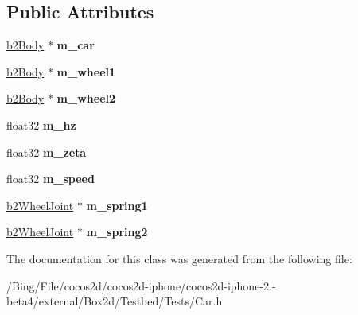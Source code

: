 \subsection*{Public Attributes}
\begin{DoxyCompactItemize}
\item 
\hypertarget{class_car_a5192d748b9653d608ed83ff331fed09f}{\hyperlink{classb2_body}{b2\-Body} $\ast$ {\bfseries m\-\_\-car}}\label{class_car_a5192d748b9653d608ed83ff331fed09f}

\item 
\hypertarget{class_car_a0e499daf3fda222a061fcf226d39ee91}{\hyperlink{classb2_body}{b2\-Body} $\ast$ {\bfseries m\-\_\-wheel1}}\label{class_car_a0e499daf3fda222a061fcf226d39ee91}

\item 
\hypertarget{class_car_a88b3909e2309f6e5e6709405671d7e99}{\hyperlink{classb2_body}{b2\-Body} $\ast$ {\bfseries m\-\_\-wheel2}}\label{class_car_a88b3909e2309f6e5e6709405671d7e99}

\item 
\hypertarget{class_car_a451f76486515a3226002e596c71274fb}{float32 {\bfseries m\-\_\-hz}}\label{class_car_a451f76486515a3226002e596c71274fb}

\item 
\hypertarget{class_car_a1b507c506f3d4c173e3f18bd017d4bcd}{float32 {\bfseries m\-\_\-zeta}}\label{class_car_a1b507c506f3d4c173e3f18bd017d4bcd}

\item 
\hypertarget{class_car_a3a1328ee8e0a22eb7fe8ef5bf2c4ac5b}{float32 {\bfseries m\-\_\-speed}}\label{class_car_a3a1328ee8e0a22eb7fe8ef5bf2c4ac5b}

\item 
\hypertarget{class_car_a76825340764dd2533cb364ad3510d7fe}{\hyperlink{classb2_wheel_joint}{b2\-Wheel\-Joint} $\ast$ {\bfseries m\-\_\-spring1}}\label{class_car_a76825340764dd2533cb364ad3510d7fe}

\item 
\hypertarget{class_car_aec633ce888442266c833cb5a4a0707b0}{\hyperlink{classb2_wheel_joint}{b2\-Wheel\-Joint} $\ast$ {\bfseries m\-\_\-spring2}}\label{class_car_aec633ce888442266c833cb5a4a0707b0}

\end{DoxyCompactItemize}


The documentation for this class was generated from the following file\-:\begin{DoxyCompactItemize}
\item 
/\-Bing/\-File/cocos2d/cocos2d-\/iphone/cocos2d-\/iphone-\/2.-\/beta4/external/\-Box2d/\-Testbed/\-Tests/Car.\-h\end{DoxyCompactItemize}
